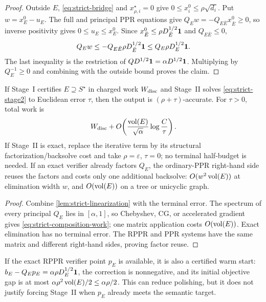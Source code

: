 \begin{proof}
Outside $E$, \cref{eq:strict-bridge} and $x_{\rho,i}^\star=0$ give
$0\leq x_i^0\leq\rho\sqrt{d_i}$.  Put $w=x_E^0-u_E$.  The full and principal
PPR equations give $Q_Ew=-Q_{E\bar E}x_{\bar E}^0\geq0$, so inverse
positivity gives $0\leq u_E\leq x_E^0$.  Since
$x_{\bar E}^0\leq\rho D_{\bar E}^{1/2}\mathbf{1}$ and $Q_{E\bar E}\leq0$,
\begin{equation*}
 Q_Ew\leq-Q_{E\bar E}\rho D_{\bar E}^{1/2}\mathbf{1}
 \leq Q_E\rho D_E^{1/2}\mathbf{1}.
\end{equation*}
The last inequality is the restriction of
$QD^{1/2}\mathbf{1}=\alpha D^{1/2}\mathbf{1}$.  Multiplying by $Q_E^{-1}\geq0$ and
combining with the outside bound proves the claim.
\end{proof}

\begin{theorem}
\label{thm:strict-composition}
If Stage~I certifies $E\supseteq S^\star$ in charged work $W_{\rm disc}$ and
Stage~II solves \cref{eq:strict-stage2} to Euclidean error $\tau$, then the
output is $(\rho+\tau)$-accurate.  For $\tau>0$, total work is
\begin{equation}
 W_{\rm disc}+O\!\left(
   \frac{\operatorname{vol}(E)}{\sqrt\alpha}
   \log\frac{C}{\tau}
 \right).
 \label{eq:strict-composition-work}
\end{equation}
If Stage~II is exact, replace the iterative term by its structural
factorization/backsolve cost and take $\rho=\varepsilon$, $\tau=0$; no
terminal half-budget is needed.  If an exact verifier already factors $Q_E$, the
ordinary-PPR right-hand side reuses the factors and costs only one additional
backsolve: $O(w^2\operatorname{vol}(E))$ at elimination width $w$, and $O(\operatorname{vol}(E))$ on a
tree or unicyclic graph.
\end{theorem}

\begin{proof}
Combine \cref{lem:strict-linearization} with the terminal error.  The spectrum
of every principal $Q_E$ lies in $[\alpha,1]$, so Chebyshev, CG, or accelerated
gradient gives \cref{eq:strict-composition-work}; one matrix application costs
$O(\operatorname{vol}(E))$.  Exact elimination has no terminal error.  The RPPR and PPR
systems have the same matrix and different right-hand sides, proving factor
reuse.
\end{proof}

If the exact RPPR verifier point $p_E$ is available, it is also a certified
warm start: $b_E-Q_Ep_E=\alpha\rho D_E^{1/2}\mathbf{1}$, the correction is
nonnegative, and its initial objective gap is at most
$\alpha\rho^2\operatorname{vol}(E)/2\leq\alpha\rho/2$.  This can reduce polishing, but it
does not justify forcing Stage~II when $p_E$ already meets the semantic target.

